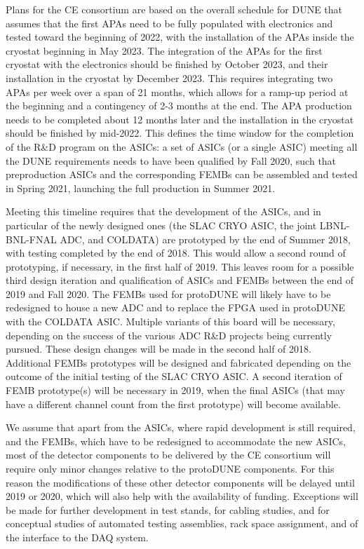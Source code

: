Plans for the CE consortium are based on the overall schedule for DUNE
that assumes that the first APAs need to be fully populated with electronics
and tested toward the beginning of 2022, with the installation of
the APAs inside the cryostat beginning in May 2023. The integration of the
APAs for the first cryostat with the electronics should be finished by
October 2023, and their installation in the cryostat by December 2023.
This requires integrating two APAs per week over a span of 21 months,
which allows for a ramp-up period at the beginning and a contingency of
2-3 months at the end. The APA production needs to be completed
about 12 months later and the installation in the cryostat should be
finished by mid-2022. This defines the time window for the completion of
the R\&D program on the ASICs: a set of ASICs (or a single ASIC) meeting
all the DUNE requirements needs to have been qualified by Fall 2020, such
that preproduction ASICs and the corresponding FEMBs can be assembled and
tested in Spring 2021, launching the full production in Summer 2021.

Meeting this timeline requires that the development of the ASICs, and in particular
of the newly designed ones (the SLAC CRYO ASIC, the joint LBNL-BNL-FNAL ADC,
and COLDATA) are prototyped by the end of Summer 2018, with testing
completed by the end of 2018. This would allow a second round of prototyping,
if necessary, in the first half of 2019. This leaves room for a possible
third design iteration and qualification of ASICs and FEMBs between the
end of 2019 and Fall 2020. The FEMBs used for protoDUNE will
likely have to be redesigned to house a new ADC and to replace the FPGA used
in protoDUNE with the COLDATA ASIC. Multiple variants of this board will be
necessary, depending on the success of the various ADC R\&D projects being currently
pursued. These design changes will be made in the second half of 2018.
Additional FEMBs prototypes will be designed and fabricated depending on
the outcome of the initial testing of the SLAC CRYO ASIC. A second iteration
of FEMB prototype(s) will be necessary in 2019, when the final ASICs (that
may have a different channel count from the first prototype) will become
available.

We assume that apart from the ASICs, where rapid development is still
required, and the FEMBs, which have to be redesigned to accommodate the
new ASICs, most of the detector components to be delivered by the CE consortium
will require only minor changes relative to the protoDUNE components. For
this reason the modifications of these other detector components will
be delayed until 2019 or 2020, which will also help with the availability of funding.
Exceptions will be made for further development in test stands, for cabling
studies, and for conceptual studies of automated testing assemblies, rack space
assignment, and of the interface to the DAQ system.
